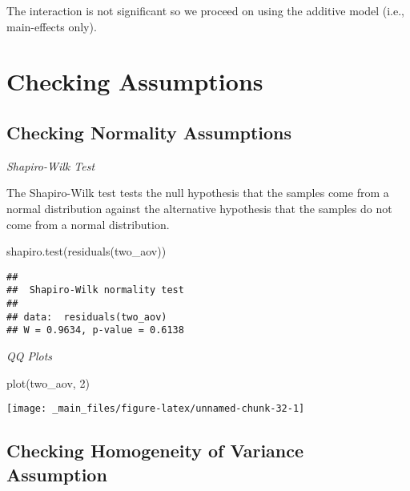 \documentclass[
]{book}
\newenvironment{Shaded}{\begin{snugshade}}{\end{snugshade}}
\newcommand{\DecValTok}[1]{\textcolor[rgb]{0.00,0.00,0.81}{#1}}
\newcommand{\FunctionTok}[1]{\textcolor[rgb]{0.00,0.00,0.00}{#1}}
\newcommand{\NormalTok}[1]{#1}
\begin{document}
The interaction is not significant so we proceed on using the additive model (i.e., main-effects only).

\hypertarget{checking-assumptions-1}{%
\chapter{Checking Assumptions}\label{checking-assumptions-1}}

\hypertarget{checking-normality-assumptions-1}{%
\section{Checking Normality Assumptions}\label{checking-normality-assumptions-1}}

\emph{Shapiro-Wilk Test}

The Shapiro-Wilk test tests the null hypothesis that the samples come from a normal distribution against the alternative hypothesis that the samples do not come from a normal distribution.

\begin{Shaded}
\begin{Highlighting}[]
\FunctionTok{shapiro.test}\NormalTok{(}\FunctionTok{residuals}\NormalTok{(two\_aov))}
\end{Highlighting}
\end{Shaded}

\begin{verbatim}
## 
##  Shapiro-Wilk normality test
## 
## data:  residuals(two_aov)
## W = 0.9634, p-value = 0.6138
\end{verbatim}

\emph{QQ Plots}

\begin{Shaded}
\begin{Highlighting}[]
\FunctionTok{plot}\NormalTok{(two\_aov, }\DecValTok{2}\NormalTok{)}
\end{Highlighting}
\end{Shaded}

\begin{center}\texttt{[image: \_main\_files/figure-latex/unnamed-chunk-32-1]} \end{center}

\hypertarget{checking-homogeneity-of-variance-assumption-1}{%
\section{Checking Homogeneity of Variance Assumption}\label{checking-homogeneity-of-variance-assumption-1}}
\end{document}
